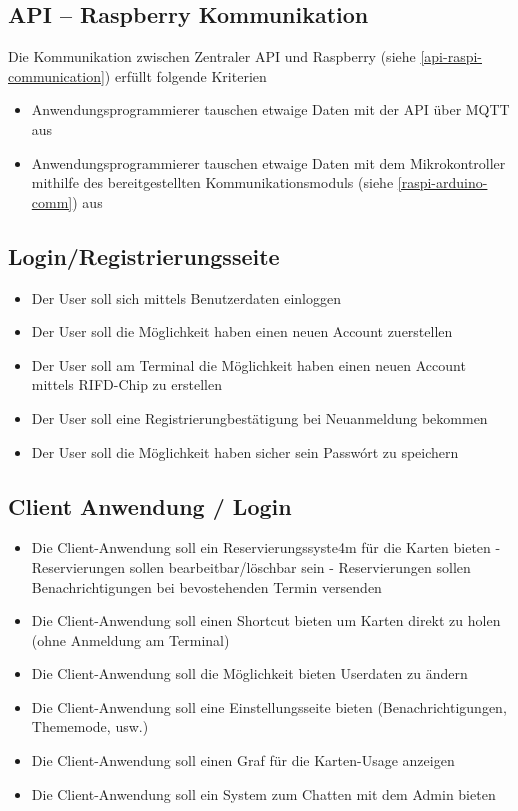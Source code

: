 \documentclass[a4paper]{article}
\begin{document}
\subsection{API -- Raspberry Kommunikation}
Die Kommunikation zwischen Zentraler API und Raspberry (siehe \ref{api-raspi-communication}) erfüllt folgende Kriterien 
\begin{itemize}
    \item Anwendungsprogrammierer tauschen etwaige Daten mit der API über MQTT aus
    \item Anwendungsprogrammierer tauschen etwaige Daten mit dem Mikrokontroller mithilfe des bereitgestellten Kommunikationsmoduls (siehe \ref{raspi-arduino-comm}) aus
\end{itemize}

\subsection{Login/Registrierungsseite}
\begin{itemize}
  \item Der User soll sich mittels Benutzerdaten einloggen
  \item Der User soll die M\"oglichkeit haben einen neuen Account zuerstellen 
  \item Der User soll am Terminal die M\"oglichkeit haben einen neuen Account mittels RIFD-Chip zu erstellen
  \item Der User soll eine Registrierungbest\"atigung bei Neuanmeldung bekommen
  \item Der User soll die M\"oglichkeit haben sicher sein Passw\'ort zu speichern
\end{itemize}

\subsection{Client Anwendung / Login}
\begin{itemize}
    \item Die Client-Anwendung soll ein Reservierungssyste4m f\"ur die Karten bieten
    \subitem - Reservierungen sollen bearbeitbar/l\"oschbar sein
    \subitem - Reservierungen sollen Benachrichtigungen bei bevostehenden Termin versenden
    \item Die Client-Anwendung soll einen Shortcut bieten um Karten direkt zu holen (ohne Anmeldung am Terminal)
    \item Die Client-Anwendung soll die M\"oglichkeit bieten Userdaten zu \"andern
    \item Die Client-Anwendung soll eine Einstellungsseite bieten (Benachrichtigungen, Thememode, usw.)
    \item Die Client-Anwendung soll einen Graf f\"ur die Karten-Usage anzeigen
    \item Die Client-Anwendung soll ein System zum Chatten mit dem Admin bieten
\end{itemize}
\end{document}

